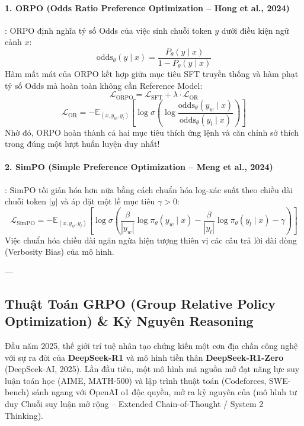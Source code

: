\paragraph{1. ORPO (Odds Ratio Preference Optimization -- Hong et al., 2024)}:
ORPO định nghĩa tỷ số Odds của việc sinh chuỗi token $y$ dưới điều kiện ngữ cảnh $x$:
\begin{equation}
\text{odds}_\theta(y \mid x) = \frac{P_\theta(y \mid x)}{1 - P_\theta(y \mid x)}
\end{equation}
Hàm mất mát của ORPO kết hợp giữa mục tiêu SFT truyền thống và hàm phạt tỷ số Odds mà hoàn toàn không cần Reference Model:
\begin{equation}
\mathcal{L}_{\text{ORPO}} = \mathcal{L}_{\text{SFT}} + \lambda \cdot \mathcal{L}_{\text{OR}}
\end{equation}
\begin{equation}
\mathcal{L}_{\text{OR}} = -\mathbb{E}_{(x, y_w, y_l)} \left[ \log \sigma\left( \log \frac{\text{odds}_\theta(y_w \mid x)}{\text{odds}_\theta(y_l \mid x)} \right) \right]
\end{equation}
Nhờ đó, ORPO hoàn thành cả hai mục tiêu thích ứng lệnh và căn chỉnh sở thích trong đúng một lượt huấn luyện duy nhất!

\paragraph{2. SimPO (Simple Preference Optimization -- Meng et al., 2024)}:
SimPO tối giản hóa hơn nữa bằng cách chuẩn hóa log-xác suất theo chiều dài chuỗi token $|y|$ và áp đặt một lề mục tiêu $\gamma > 0$:
\begin{equation}
\mathcal{L}_{\text{SimPO}} = -\mathbb{E}_{(x, y_w, y_l)} \left[ \log \sigma\left( \frac{\beta}{|y_w|} \log \pi_\theta(y_w \mid x) - \frac{\beta}{|y_l|} \log \pi_\theta(y_l \mid x) - \gamma \right) \right]
\end{equation}
Việc chuẩn hóa chiều dài ngăn ngừa hiện tượng thiên vị các câu trả lời dài dòng (Verbosity Bias) của mô hình.

---

\subsection{Thuật Toán GRPO (Group Relative Policy Optimization) \& Kỷ Nguyên Reasoning}
\label{sec:grpo-deepseek-r1}

Đầu năm 2025, thế giới trí tuệ nhân tạo chứng kiến một cơn địa chấn công nghệ với sự ra đời của \textbf{DeepSeek-R1} và mô hình tiền thân \textbf{DeepSeek-R1-Zero} (DeepSeek-AI, 2025). Lần đầu tiên, một mô hình mã nguồn mở đạt năng lực suy luận toán học (AIME, MATH-500) và lập trình thuật toán (Codeforces, SWE-bench) sánh ngang với OpenAI o1 độc quyền, mở ra kỷ nguyên của  (mô hình tư duy Chuỗi suy luận mở rộng -- Extended Chain-of-Thought / System 2 Thinking).

